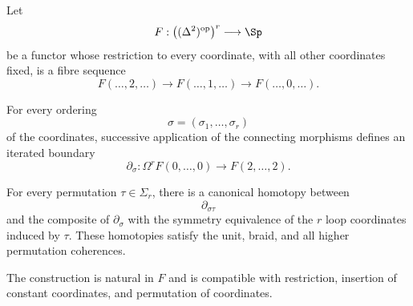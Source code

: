 \begin{lemma}
\label{lem:coherent-iterated-boundaries}
Let
\[
    F:
    \bigl(
      (\Delta^2)^{\mathrm{op}}
    \bigr)^r
    \longrightarrow
    \Sp
\]
be a functor whose restriction to every coordinate, with all other
coordinates fixed, is a fibre sequence
\[
    F(\ldots,2,\ldots)
    \longrightarrow
    F(\ldots,1,\ldots)
    \longrightarrow
    F(\ldots,0,\ldots).
\]

For every ordering
\[
    \sigma=(\sigma_1,\ldots,\sigma_r)
\]
of the coordinates, successive application of the connecting morphisms
defines an iterated boundary
\[
    \partial_\sigma:
    \Omega^rF(0,\ldots,0)
    \longrightarrow
    F(2,\ldots,2).
\]

For every permutation \(\tau\in\Sigma_r\), there is a canonical homotopy
between
\[
    \partial_{\sigma\tau}
\]
and the composite of \(\partial_\sigma\) with the symmetry equivalence of
the \(r\) loop coordinates induced by \(\tau\).  These homotopies satisfy
the unit, braid, and all higher permutation coherences.

The construction is natural in \(F\) and is compatible with restriction,
insertion of constant coordinates, and permutation of coordinates.
\end{lemma}

